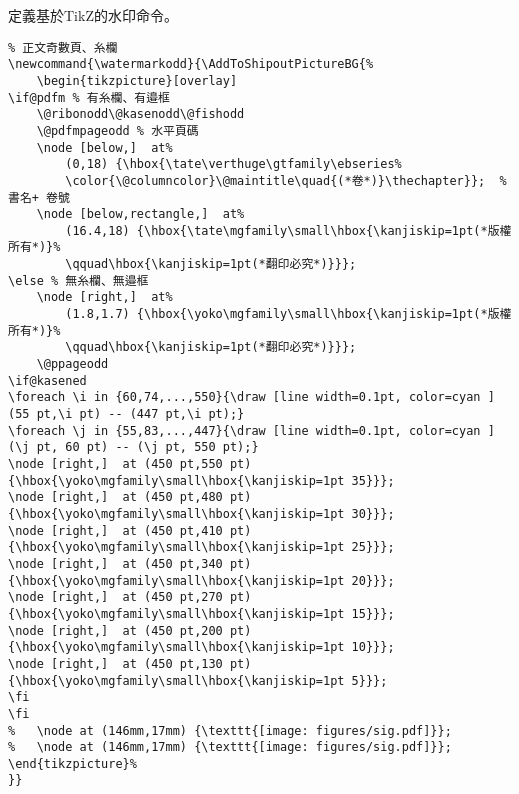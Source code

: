 \par%
定義基於TikZ的水印命令。
\begin{lstlisting}[firstnumber=541]
%%%% 正兒八經的水印命令（開始）
% 正文奇數頁、糸欄
\newcommand{\watermarkodd}{\AddToShipoutPictureBG{%
	\begin{tikzpicture}[overlay]
\if@pdfm % 有糸欄、有邉框
	\@ribonodd\@kasenodd\@fishodd
	\@pdfmpageodd % 水平頁碼
	\node [below,]  at%
		(0,18) {\hbox{\tate\verthuge\gtfamily\ebseries%
		\color{\@columncolor}\@maintitle\quad{(*卷*)}\thechapter}};  % 書名+ 卷號
	\node [below,rectangle,]  at%
		(16.4,18) {\hbox{\tate\mgfamily\small\hbox{\kanjiskip=1pt(*版權所有*)}%
		\qquad\hbox{\kanjiskip=1pt(*翻印必究*)}}};
\else % 無糸欄、無邉框
	\node [right,]  at%
		(1.8,1.7) {\hbox{\yoko\mgfamily\small\hbox{\kanjiskip=1pt(*版權所有*)}%
		\qquad\hbox{\kanjiskip=1pt(*翻印必究*)}}};
	\@ppageodd
\if@kasened
\foreach \i in {60,74,...,550}{\draw [line width=0.1pt, color=cyan ] (55 pt,\i pt) -- (447 pt,\i pt);}
\foreach \j in {55,83,...,447}{\draw [line width=0.1pt, color=cyan ] (\j pt, 60 pt) -- (\j pt, 550 pt);}
\node [right,]  at (450 pt,550 pt) {\hbox{\yoko\mgfamily\small\hbox{\kanjiskip=1pt 35}}};
\node [right,]  at (450 pt,480 pt) {\hbox{\yoko\mgfamily\small\hbox{\kanjiskip=1pt 30}}};
\node [right,]  at (450 pt,410 pt) {\hbox{\yoko\mgfamily\small\hbox{\kanjiskip=1pt 25}}};
\node [right,]  at (450 pt,340 pt) {\hbox{\yoko\mgfamily\small\hbox{\kanjiskip=1pt 20}}};
\node [right,]  at (450 pt,270 pt) {\hbox{\yoko\mgfamily\small\hbox{\kanjiskip=1pt 15}}};
\node [right,]  at (450 pt,200 pt) {\hbox{\yoko\mgfamily\small\hbox{\kanjiskip=1pt 10}}};
\node [right,]  at (450 pt,130 pt) {\hbox{\yoko\mgfamily\small\hbox{\kanjiskip=1pt 5}}};
\fi
\fi
%	\node at (146mm,17mm) {\texttt{[image: figures/sig.pdf]}};
%	\node at (146mm,17mm) {\texttt{[image: figures/sig.pdf]}};
\end{tikzpicture}%
}}


\end{lstlisting}
